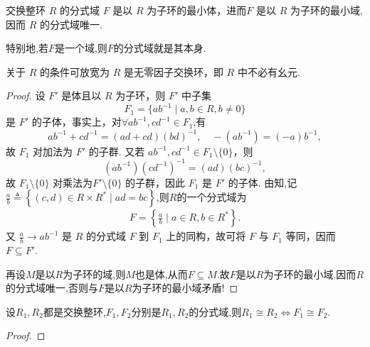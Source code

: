 \documentclass[../../main.tex]{subfiles}%
\begin{document}
\begin{theorem}\label{theorem:分式域是包含R的最小域且唯一}
交换整环 \( R \) 的分式域 \( F \) 是以 \( R \) 为子环的最小体，进而\( F \) 是以 \( R \) 为子环的最小域,因而 \( R \) 的分式域唯一.

特别地,若$F$是一个域,则$F$的分式域就是其本身.
\end{theorem}
\begin{remark}
关于 \( R \) 的条件可放宽为 \( R \) 是无零因子交换环，即 \( R \) 中不必有幺元.
\end{remark}
\begin{proof}

设 \( F' \) 是体且以 \( R \) 为子环，则 \( F' \) 中子集
\[
F_1 = \{ab^{-1} \mid a, b \in R, b \neq 0\}
\]
是 \( F' \) 的子体，事实上，对$\forall ab^{-1}, cd^{-1} \in F_1$,有
\[
ab^{-1} + cd^{-1} = (ad + cd)(bd)^{-1}, \quad -(ab^{-1}) = (-a)b^{-1},
\]
故 \( F_1 \) 对加法为 \( F' \) 的子群. 又若 \( ab^{-1}, cd^{-1} \in F_1 \setminus \{0\} \)，则
\[
(ab^{-1})(cd^{-1})^{-1} = (ad)(bc)^{-1},
\]
故 \( F_1 \setminus \{0\} \) 对乘法为\( F' \setminus \{0\} \) 的子群，因此 \( F_1 \) 是 \( F' \) 的子体. 由知,记$\frac{a}{b}\triangleq \left\{ \left( c,d \right) \in R\times R^*\mid ad=bc \right\}$,则$R$的一个分式域为
\begin{align*}
F=\left\{ \frac{a}{b}\mid a\in R,b\in R^* \right\} .
\end{align*}
又 \( \frac{a}{b} \to ab^{-1} \) 是 \( R \) 的分式域 \( F \) 到 \( F_1 \) 上的同构，故可将 \( F \) 与 \( F_1 \) 等同，因而 \( F \subseteq F' \).

再设$M$是以$R$为子环的域,则$M$也是体,从而$F\subseteq M$.故$F$是以$R$为子环的最小域.因而$R$的分式域唯一,否则与$F$是以$R$为子环的最小域矛盾!

\end{proof}

\begin{corollary}\label{corollary:分式域同构等价于生成环同构}
设$R_1,R_2$都是交换整环,$F_1,F_2$分别是$R_1,R_2$的分式域,则$R_1\cong R_2\iff F_1\cong F_2$.
\end{corollary}
\begin{proof}



\end{proof}
\end{document}
